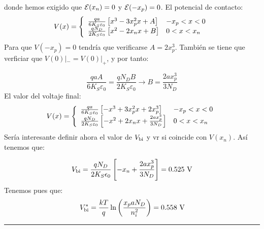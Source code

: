 donde hemos exigido que $\mathcal{E}(x_n)=0$ y $\mathcal{E}(-x_p)=0$. El potencial de contacto:
\begin{equation*}
    V (x) =  \left\lbrace \begin{array}{ll}
        \frac{qa}{6K_S\varepsilon_0} \left[ x^3 - 3x_p^2 x + A \right] & -x_p < x < 0  \\ 
        \frac{qN_D}{2K_S\varepsilon_0} \left[ x^2 - 2x_n x + B \right] & 0 < x < x_n  
    \end{array} \right.
\end{equation*} 
Para que $V(-x_p)=0$ tendría que verificarse $A=2x_p^3$. También se tiene que verficiar que $V(0)|_{-}=V(0)|_{+}$, y por tanto: 

\begin{equation*}
    \frac{qa A}{6K_S\varepsilon_0} = \frac{qN_D B}{2K_S\varepsilon_0} \rightarrow B = \frac{2 a x_p^3}{3 N_D}
\end{equation*}
El valor del voltaje final: 
\begin{equation*}
    V (x) =  \left\lbrace \begin{array}{ll}
        \frac{qa}{6K_S\varepsilon_0} \left[ -x^3 + 3x_p^2 x + 2x_p^3 \right] & -x_p < x < 0  \\ 
        \frac{qN_D}{2K_S\varepsilon_0} \left[ -x^2 + 2x_n x + \frac{2 a x_p^3}{3 N_D} \right] & 0 < x < x_n  
    \end{array} \right.
\end{equation*}
Sería interesante definir ahora el valor de $V_{\text{bi}}$ y vr si coincide con $V(x_n)$. Así tenemos que:

\begin{equation}
    \Vbi = \frac{qN_D}{2K_S\epsilon_0} \ccorchetes{-x_n+\frac{2ax_p^3}{3N_D}} = 0.525 \ \unit{V}
\end{equation}
Tenemos pues que: 
\begin{equation}
    \Vbi^* = \frac{kT}{q} \ln \parentesis{\frac{x_p a N_D}{n_i^2}} = 0.558 \ \unit{V}
\end{equation}


\rule{\textwidth}{0.1pt} \\[2pt]